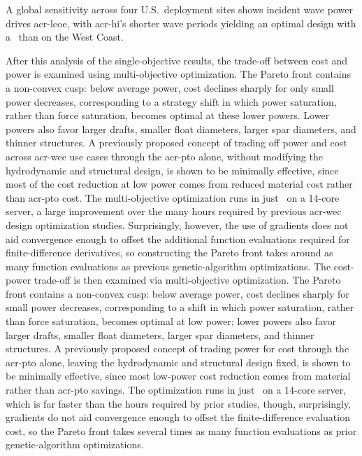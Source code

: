     A global sensitivity across four U.S.\ deployment sites shows incident wave power drives \gls{acr-lcoe}, with \gls{acr-hi}'s shorter wave periods yielding an optimal design with a \resultsRE[HawaiiDesignCharacteristics]~than on the West Coast.
\fi

\ifdefined\DISSERTATION
    After this analysis of the single-objective results, the trade-off between cost and power is examined using multi-objective optimization.
    The Pareto front contains a non-convex cusp: below \resultsRE[powerWhereCusp] average power, cost declines sharply for only small power decreases, corresponding to a strategy shift in which power saturation, rather than force saturation, becomes optimal at these lower powers.
    Lower powers also favor larger drafts, smaller float diameters, larger spar diameters, and thinner structures.
    A previously proposed concept of trading off power and cost across \gls{acr-wec} use cases through the \gls{acr-pto} alone, without modifying the hydrodynamic and structural design, is shown to be minimally effective, since most of the cost reduction at low power comes from reduced material cost rather than \gls{acr-pto} cost.
    The multi-objective optimization runs in just \resultsRE[paretoRuntime]~on a 14-core server, a large improvement over the many hours required by previous \gls{acr-wec} design optimization studies.
    Surprisingly, however, the use of gradients does not aid convergence enough to offset the additional function evaluations required for finite-difference derivatives, so constructing the Pareto front takes around as many function evaluations as previous genetic-algorithm optimizations.
\else
    The cost-power trade-off is then examined via multi-objective optimization.
    The Pareto front contains a non-convex cusp: below \resultsRE[powerWhereCusp] average power, cost declines sharply for small power decreases, corresponding to a shift in which power saturation, rather than force saturation, becomes optimal at low power; lower powers also favor larger drafts, smaller float diameters, larger spar diameters, and thinner structures.
    A previously proposed concept of trading power for cost through the \gls{acr-pto} alone, leaving the hydrodynamic and structural design fixed, is shown to be minimally effective, since most low-power cost reduction comes from material rather than \gls{acr-pto} savings.
    The optimization runs in just \resultsRE[paretoRuntime]~on a 14-core server, which is far faster than the hours required by prior studies, though, surprisingly, gradients do not aid convergence enough to offset the finite-difference evaluation cost, so the Pareto front takes several times as many function evaluations as prior genetic-algorithm optimizations.
\fi

